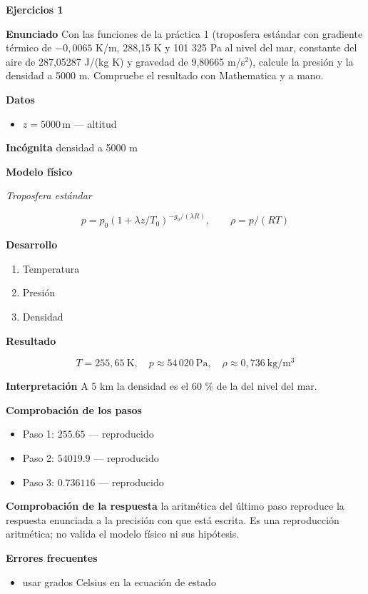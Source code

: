 \documentclass[10pt,openany]{book}
\begin{document}
\noindent\textbf{Ejercicios 1}

\noindent\textbf{Enunciado}
Con las funciones de la práctica 1 (troposfera estándar con gradiente térmico de \(-0{,}0065\) K/m, 288,15 K y 101 325 Pa al nivel del mar, constante del aire de 287,05287 J/(kg K) y gravedad de 9,80665 m/s\(^2\)), calcule la presión y la densidad a 5000 m. Compruebe el resultado con Mathematica y a mano.

\noindent\textbf{Datos}
\begin{itemize}
\item $z = 5000\,\mathrm{m}$ — altitud
\end{itemize}

\noindent\textbf{Incógnita}
densidad a 5000 m

\noindent\textbf{Modelo físico}

\noindent\textit{Troposfera estándar}

\[
p = p_0\left(1 + \lambda z/T_0\right)^{-g_0/(\lambda R)},\qquad \rho = p/(R T)
\]

\noindent\textbf{Desarrollo}
\begin{enumerate}
\item
Temperatura
\item
Presión
\item
Densidad
\end{enumerate}

\noindent\textbf{Resultado}

\[
T = 255{,}65\ \mathrm{K},\quad p \approx 54\,020\ \mathrm{Pa},\quad \rho \approx 0{,}736\ \mathrm{kg/m^{3}}
\]

\noindent\textbf{Interpretación}
A 5 km la densidad es el 60 \% de la del nivel del mar.

\noindent\textbf{Comprobación de los pasos}
\begin{itemize}
\item Paso 1: $255.65$ — reproducido
\item Paso 2: $54019.9$ — reproducido
\item Paso 3: $0.736116$ — reproducido
\end{itemize}

\noindent\textbf{Comprobación de la respuesta} la aritmética del último paso reproduce la respuesta enunciada a la precisión con que está escrita. Es una reproducción aritmética; no valida el modelo físico ni sus hipótesis.

\noindent\textbf{Errores frecuentes}
\begin{itemize}
\item usar grados Celsius en la ecuación de estado
\end{itemize}
\end{document}

